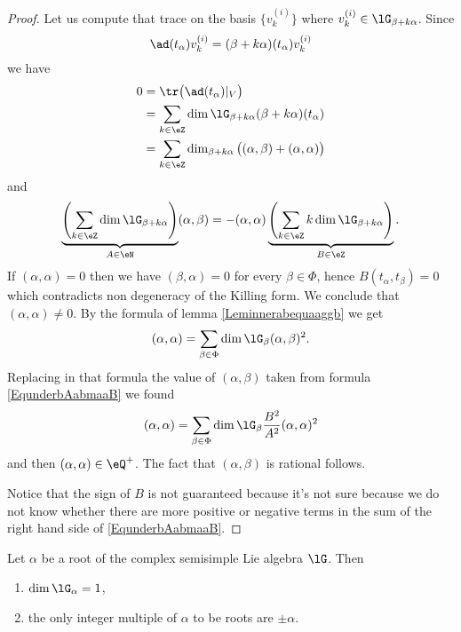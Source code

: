 \begin{proof}
    Let us compute that trace on the basis \( \{ v_k^{(i)} \}\) where \( v_k^{(i)}\in\lG_{\beta+k\alpha}\). Since
    \begin{equation}
        \ad(t_{\alpha})v_k^{(i)}=(\beta+k\alpha)(t_{\alpha})v_k^{(i)}
    \end{equation}
    we have
    \begin{subequations}
        \begin{align}
            0&=\tr\big( \ad(t_{\alpha})|_V \big)\\
            &=\sum_{k\in\eZ}\dim\lG_{\beta+k\alpha}(\beta+k\alpha)(t_{\alpha})\\
            &=\sum_{k\in\eZ}\dim_{\beta+k\alpha}\big( (\alpha,\beta)+(\alpha,\alpha) \big)
        \end{align}
    \end{subequations}
    and
    \begin{equation}        \label{EqunderbAabmaaB}
        \underbrace{\left( \sum_{k\in\eZ}\dim\lG_{\beta+k\alpha} \right)}_{A\in\eN}(\alpha,\beta)=-(\alpha,\alpha)\underbrace{\left( \sum_{k\in\eZ}k\dim\lG_{\beta+k\alpha} \right)}_{B\in\eZ}.
    \end{equation}
    If \( (\alpha,\alpha)=0\) then we have \( (\beta,\alpha)=0\) for every \( \beta\in\Phi\), hence \( B(t_{\alpha},t_{\beta})=0\) which contradicts non degeneracy of the Killing form. We conclude that \( (\alpha,\alpha)\neq 0\). By the formula of lemma \ref{Leminnerabequaaggb} we get
    \begin{equation}
        (\alpha,\alpha)=\sum_{\beta\in\Phi}\dim\lG_{\beta}(\alpha,\beta)^2.
    \end{equation}
    Replacing in that formula the value of \( (\alpha,\beta)\) taken from formula \eqref{EqunderbAabmaaB} we found
    \begin{equation}
        (\alpha,\alpha)=\sum_{\beta\in\Phi}\dim\lG_{\beta}\frac{ B^2 }{ A^2 }(\alpha,\alpha)^2
    \end{equation}
    and then \( (\alpha,\alpha)\in\eQ^+\). The fact that \( (\alpha,\beta)\) is rational follows.

    Notice that the sign of \( B\) is not guaranteed because it's not sure because we do not know whether there are more positive or negative terms in the sum of the right hand side of \eqref{EqunderbAabmaaB}.
\end{proof}

\begin{proposition}
    Let \( \alpha\) be a root of the complex semisimple Lie algebra \( \lG\). Then 
    \begin{enumerate}
        \item
            \( \dim\lG_{\alpha}=1\), 
        \item
            the only integer multiple of \( \alpha\) to be roots are \( \pm\alpha\).
    \end{enumerate}
\end{proposition}

